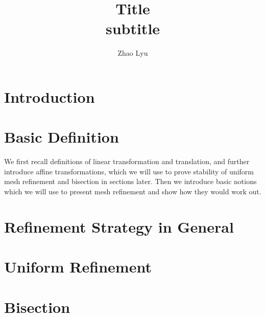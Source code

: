 \documentclass[english]{article}
\title{\textbf{Title} \\subtitle}
\author{Zhao Lyu}
\begin{document}
  \doublespacing %
  \maketitle
  \singlespacing

  \newpage %
  \tableofcontents
  \newpage

  \section{Introduction}
  
  \newpage

  \section{Basic Definition}
    We first recall definitions of linear transformation and translation, and further introduce affine transformations, which we will use to prove stability of uniform mesh refinement and bisection in sections later. Then we introduce basic notions which we will use to present mesh refinement and show how they would work out.

    
    
    
    


  \section{Refinement Strategy in General}
    

  \section{Uniform Refinement}
    

  \section{Bisection}
    

  \newpage
  
  


    




\end{document}
